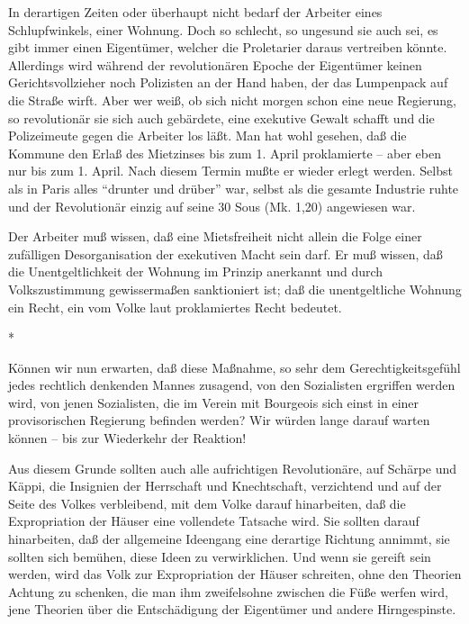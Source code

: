 \documentclass{scrbook}
\begin{document}
In derartigen Zeiten oder überhaupt nicht bedarf der Arbeiter eines Schlupfwinkels, einer Wohnung. Doch so schlecht, so ungesund sie auch sei, es gibt immer einen Eigentümer, welcher die Proletarier daraus vertreiben könnte. Allerdings wird während der revolutionären Epoche der Eigentümer keinen Gerichtsvollzieher noch Polizisten an der Hand haben, der das Lumpenpack auf die Straße wirft. Aber wer weiß, ob sich nicht morgen schon eine neue Regierung, so revolutionär sie sich auch gebärdete, eine exekutive Gewalt schafft und die Polizeimeute gegen die Arbeiter los läßt. Man hat wohl gesehen, daß die Kommune den Erlaß des Mietzinses bis zum 1. April proklamierte – aber eben nur bis zum 1. April. Nach diesem Termin mußte er wieder erlegt werden. Selbst als in Paris alles ``drunter und drüber'' war, selbst als die gesamte Industrie ruhte und der Revolutionär einzig auf seine 30 Sous (Mk. 1,20) angewiesen war.

Der Arbeiter muß wissen, daß eine Mietsfreiheit nicht allein die Folge einer zufälligen Desorganisation der exekutiven Macht sein darf. Er muß wissen, daß die Unentgeltlichkeit der Wohnung im Prinzip anerkannt und durch Volkszustimmung gewissermaßen sanktioniert ist; daß die unentgeltliche Wohnung ein Recht, ein vom Volke laut proklamiertes Recht bedeutet.

\begin{center}*\end{center}

Können wir nun erwarten, daß diese Maßnahme, so sehr dem Gerechtigkeitsgefühl jedes rechtlich denkenden Mannes zusagend, von den Sozialisten ergriffen werden wird, von jenen Sozialisten, die im Verein mit Bourgeois sich einst in einer provisorischen Regierung befinden werden? Wir würden lange darauf warten können – bis zur Wiederkehr der Reaktion!

Aus diesem Grunde sollten auch alle aufrichtigen Revolutionäre, auf Schärpe und Käppi, die Insignien der Herrschaft und Knechtschaft, verzichtend und auf der Seite des Volkes verbleibend, mit dem Volke darauf hinarbeiten, daß die Expropriation der Häuser eine vollendete Tatsache wird. Sie sollten darauf hinarbeiten, daß der allgemeine Ideengang eine derartige Richtung annimmt, sie sollten sich bemühen, diese Ideen zu verwirklichen. Und wenn sie gereift sein werden, wird das Volk zur Expropriation der Häuser schreiten, ohne den Theorien Achtung zu schenken, die man ihm zweifelsohne zwischen die Füße werfen wird, jene Theorien über die Entschädigung der Eigentümer und andere Hirngespinste.
\end{document}
